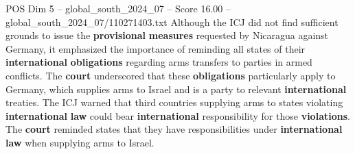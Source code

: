 \begin{textsample}{POS Dim 5 – global\_south\_2024\_07 – Score 16.00 – global\_south\_2024\_07/110271403.txt}
Although the ICJ did not find sufficient grounds to issue the \textbf{provisional} \textbf{measures} requested by Nicaragua against Germany, it emphasized the importance of reminding all states of their \textbf{international} \textbf{obligations} regarding arms transfers to parties in armed conflicts.
The \textbf{court} underscored that these \textbf{obligations} particularly apply to Germany, which supplies arms to Israel and is a party to relevant \textbf{international} treaties.
The ICJ warned that third countries supplying arms to states violating \textbf{international} \textbf{law} could bear \textbf{international} responsibility for those \textbf{violations}.
The \textbf{court} reminded states that they have responsibilities under \textbf{international} \textbf{law} when supplying arms to Israel.

\end{textsample}
